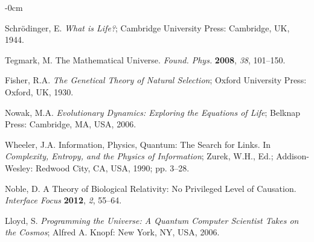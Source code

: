 \documentclass[entropy,article,submit,pdftex,moreauthors]{Definitions/mdpi}
\begin{document}
\begin{adjustwidth}{-\extralength}{0cm}



%

\begin{thebibliography}{999}

Schrödinger, E. \textit{What is Life?}; Cambridge University Press: Cambridge, UK, 1944.

Tegmark, M. The Mathematical Universe. \textit{Found. Phys.} \textbf{2008}, \textit{38}, 101–150. 

Fisher, R.A. \textit{The Genetical Theory of Natural Selection}; Oxford University Press: Oxford, UK, 1930.

Nowak, M.A. \textit{Evolutionary Dynamics: Exploring the Equations of Life}; Belknap Press: Cambridge, MA, USA, 2006.

Wheeler, J.A. Information, Physics, Quantum: The Search for Links. In \textit{Complexity, Entropy, and the Physics of Information}; Zurek, W.H., Ed.; Addison-Wesley: Redwood City, CA, USA, 1990; pp. 3–28.

Noble, D. A Theory of Biological Relativity: No Privileged Level of Causation. \textit{Interface Focus} \textbf{2012}, \textit{2}, 55–64.

Lloyd, S. \textit{Programming the Universe: A Quantum Computer Scientist Takes on the Cosmos}; Alfred A. Knopf: New York, NY, USA, 2006.


\end{thebibliography}
\end{adjustwidth}
\end{document}
